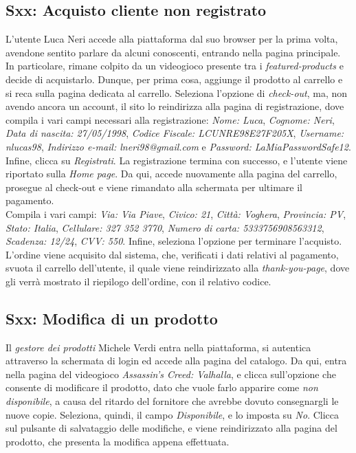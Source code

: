 \documentclass[12pt, a4paper, oneside]{book}
\begin{document}
    \subsection*{Sxx: Acquisto cliente non registrato}
    L'utente Luca Neri accede alla piattaforma dal suo browser per la prima volta, avendone sentito parlare da alcuni conoscenti, entrando nella pagina principale. In particolare, rimane colpito da un videogioco presente tra i \textit{featured-products} e decide di acquistarlo. Dunque, per prima cosa, aggiunge il prodotto al carrello e si reca sulla pagina dedicata al carrello. Seleziona l'opzione di \textit{check-out}, ma, non avendo ancora un account, il sito lo reindirizza alla pagina di registrazione, dove compila i vari campi necessari alla registrazione: \textit{Nome: Luca}, \textit{Cognome: Neri}, \textit{Data di nascita: 27/05/1998}, \textit{Codice Fiscale: LCUNRE98E27F205X}, \textit{Username: nlucas98}, \textit{Indirizzo e-mail: lneri98@gmail.com} e \textit{Password: LaMiaPasswordSafe12}. Infine, clicca su \textit{Registrati}. La registrazione termina con successo, e l'utente viene riportato sulla \textit{Home page}. Da qui, accede nuovamente alla pagina del carrello, prosegue al check-out e viene rimandato alla schermata per ultimare il pagamento.\\
    Compila i vari campi: \textit{Via: Via Piave}, \textit{Civico: 21}, \textit{Città: Voghera}, \textit{Provincia: PV}, \textit{Stato: Italia}, \textit{Cellulare: 327 352 3770}, \textit{Numero di carta: 5333756908563312}, \textit{Scadenza: 12/24}, \textit{CVV: 550}. Infine, seleziona l'opzione per terminare l'acquisto.\\
    L'ordine viene acquisito dal sistema, che, verificati i dati relativi al pagamento, svuota il carrello dell'utente, il quale viene reindirizzato alla \textit{thank-you-page}, dove gli verrà mostrato il riepilogo dell'ordine, con il relativo codice.

    \subsection*{Sxx: Modifica di un prodotto}
    Il \textit{gestore dei prodotti} Michele Verdi entra nella piattaforma, si autentica attraverso la schermata di login ed accede alla pagina del catalogo. Da qui, entra nella pagina del videogioco \textit{Assassin's Creed: Valhalla}, e clicca sull'opzione che consente di modificare il prodotto, dato che vuole farlo apparire come \textit{non disponibile}, a causa del ritardo del fornitore che avrebbe dovuto consegnargli le nuove copie. Seleziona, quindi, il campo \textit{Disponibile}, e lo imposta su \textit{No}. Clicca sul pulsante di salvataggio delle modifiche, e viene reindirizzato alla pagina del prodotto, che presenta la modifica appena effettuata.
\end{document}
